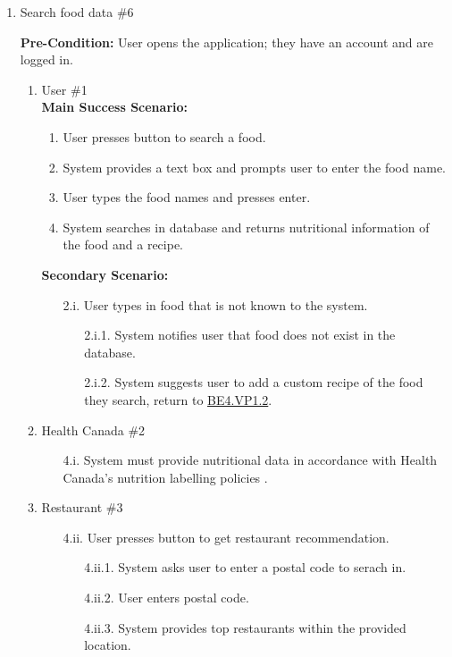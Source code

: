 \documentclass[]{article}
\begin{document}
\begin{enumerate}[{\bf BE1.}]
	\item Search food data \#6
	
	\textbf{Pre-Condition:} User opens the application; they have an account and are logged in.
		\begin{enumerate}[{\bf VP1.}]
			\item User \#1 \\
				\textbf{Main Success Scenario:} 
				\begin{enumerate}[{1.}]
					\item User presses button to search a food.
					\item System provides a text box and prompts user to enter the food name.
					\item User types the food names and presses enter.
					\item System searches in database and returns nutritional information of the food and a recipe.
				\end{enumerate}
				\textbf{Secondary Scenario:}
				\begin{enumerate}
					\item[2.i.] User types in food that is not known to the system.
					\begin{enumerate}
						\item[2.i.1.] System notifies user that food does not exist in the database.
						\item[2.i.2.] System suggests user to add a custom recipe of the food they search, return to \hyperlink{BE4.VP1.2}{BE4.VP1.2}.
					\end{enumerate}
				\end{enumerate}
			\item Health Canada  \#2
				\begin{enumerate}
					\item[4.i.] System must provide nutritional data in accordance with Health Canada's nutrition labelling policies \cite{CanadaNutrition}.
				\end{enumerate}
			\item Restaurant \#3
				\begin{enumerate}
					\item[4.ii.] User presses button to get restaurant recommendation.
					\begin{enumerate}
						\item[4.ii.1.] System asks user to enter a postal code to serach in.
						\item[4.ii.2.] User enters postal code.
						\item[4.ii.3.] System provides top restaurants within the provided location.
					\end{enumerate}
					

\end{enumerate}
\end{enumerate}
\end{enumerate}
\end{document}
